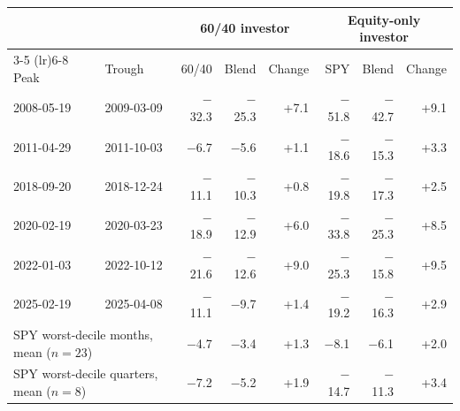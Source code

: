\begin{tabular}{llrrrrrr}
\toprule
& & \multicolumn{3}{c}{60/40 investor} & \multicolumn{3}{c}{Equity-only investor} \\
\cmidrule(lr){3-5} \cmidrule(lr){6-8}
Peak & Trough & 60/40 & Blend & Change & SPY & Blend & Change \\
\midrule
2008-05-19 & 2009-03-09 & $-$32.3 & $-$25.3 & +7.1 & $-$51.8 & $-$42.7 & +9.1 \\
2011-04-29 & 2011-10-03 & $-$6.7 & $-$5.6 & +1.1 & $-$18.6 & $-$15.3 & +3.3 \\
2018-09-20 & 2018-12-24 & $-$11.1 & $-$10.3 & +0.8 & $-$19.8 & $-$17.3 & +2.5 \\
2020-02-19 & 2020-03-23 & $-$18.9 & $-$12.9 & +6.0 & $-$33.8 & $-$25.3 & +8.5 \\
2022-01-03 & 2022-10-12 & $-$21.6 & $-$12.6 & +9.0 & $-$25.3 & $-$15.8 & +9.5 \\
2025-02-19 & 2025-04-08 & $-$11.1 & $-$9.7 & +1.4 & $-$19.2 & $-$16.3 & +2.9 \\
\midrule
\multicolumn{2}{l}{SPY worst-decile months, mean ($n=23$)} & $-$4.7 & $-$3.4 & +1.3 & $-$8.1 & $-$6.1 & +2.0 \\
\multicolumn{2}{l}{SPY worst-decile quarters, mean ($n=8$)} & $-$7.2 & $-$5.2 & +1.9 & $-$14.7 & $-$11.3 & +3.4 \\
\bottomrule
\end{tabular}
